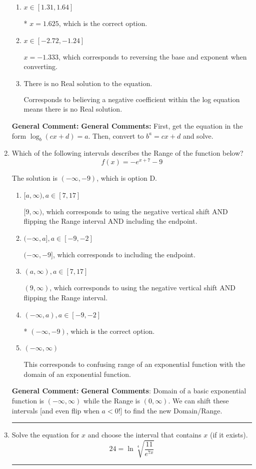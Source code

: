 \documentclass{extbook}[14pt]
\newcommand{\litem}[1]{\item #1

\rule{\textwidth}{0.4pt}}
\begin{document}
\begin{enumerate}
{\begin{enumerate}[label=\Alph*.]
$x = -4.667$, which corresponds to reversing the base and exponent when converting and reversing the value with $x$.
\item \( x \in [1.31, 1.64] \)

* $x = 1.625$, which is the correct option.
\item \( x \in [-2.72, -1.24] \)

$x = -1.333$, which corresponds to reversing the base and exponent when converting.
\item \( \text{There is no Real solution to the equation.} \)

Corresponds to believing a negative coefficient within the log equation means there is no Real solution.
\end{enumerate}

\textbf{General Comment:} \textbf{General Comments:} First, get the equation in the form $\log_b{(cx+d)} = a$. Then, convert to $b^a = cx+d$ and solve.
}
\litem{
Which of the following intervals describes the Range of the function below?
\[ f(x) = -e^{x+7}-9 \]

The solution is \( (-\infty, -9) \), which is option D.\begin{enumerate}[label=\Alph*.]
\item \( [a, \infty), a \in [7, 17] \)

$[9, \infty)$, which corresponds to using the negative vertical shift AND flipping the Range interval AND including the endpoint.
\item \( (-\infty, a], a \in [-9, -2] \)

$(-\infty, -9]$, which corresponds to including the endpoint.
\item \( (a, \infty), a \in [7, 17] \)

$(9, \infty)$, which corresponds to using the negative vertical shift AND flipping the Range interval.
\item \( (-\infty, a), a \in [-9, -2] \)

* $(-\infty, -9)$, which is the correct option.
\item \( (-\infty, \infty) \)

This corresponds to confusing range of an exponential function with the domain of an exponential function.
\end{enumerate}

\textbf{General Comment:} \textbf{General Comments}: Domain of a basic exponential function is $(-\infty, \infty)$ while the Range is $(0, \infty)$. We can shift these intervals [and even flip when $a<0$!] to find the new Domain/Range.
}
\litem{
 Solve the equation for $x$ and choose the interval that contains $x$ (if it exists).
\[  24 = \ln{\sqrt[4]{\frac{11}{e^{7x}}}} \]

}
\end{enumerate}
\end{document}
